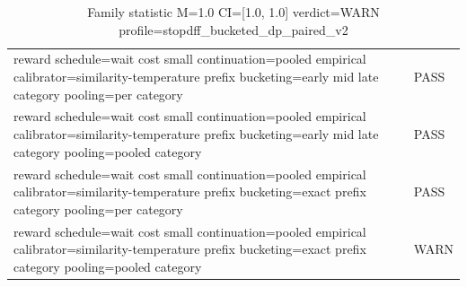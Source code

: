 \begin{table}[h]
\begin{tabular}{ll}
reward schedule=wait cost small  continuation=pooled empirical  calibrator=similarity-temperature  prefix bucketing=early mid late  category pooling=per category & PASS \\
reward schedule=wait cost small  continuation=pooled empirical  calibrator=similarity-temperature  prefix bucketing=early mid late  category pooling=pooled category & PASS \\
reward schedule=wait cost small  continuation=pooled empirical  calibrator=similarity-temperature  prefix bucketing=exact prefix  category pooling=per category & PASS \\
reward schedule=wait cost small  continuation=pooled empirical  calibrator=similarity-temperature  prefix bucketing=exact prefix  category pooling=pooled category & WARN \\
\hline
\end{tabular}
\caption{Family statistic M=1.0 CI=[1.0, 1.0] verdict=WARN profile=stopdff_bucketed_dp_paired_v2}
\end{table}

